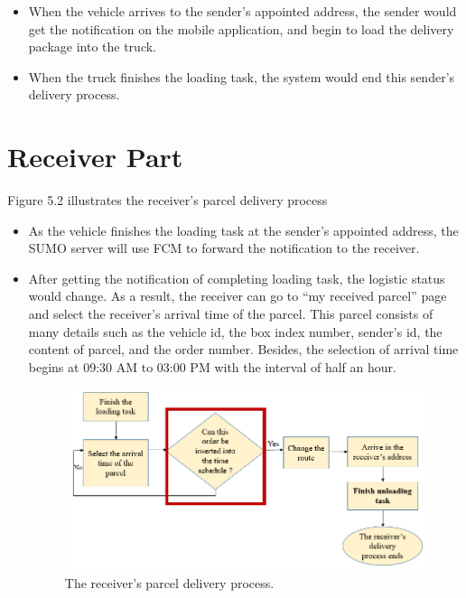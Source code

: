 \documentclass[12pt]{ksthesis}
\begin{document}
\begin{thesis}
{\begin{itemize}
\item
When the vehicle arrives to the sender’s appointed address, the sender would get the notification on the mobile application, and begin to load the delivery package into the truck.

\item
When the truck finishes the loading task, the system would end this sender’s delivery process.

\end{itemize}







\section{Receiver Part}


Figure 5.2 illustrates the receiver’s parcel delivery process

\begin{itemize}
\item
As the vehicle finishes the loading task at the sender’s appointed address, the SUMO server will use FCM to forward the notification to the receiver.

\item
After getting the notification of completing loading task, the logistic status would change. As a result, the receiver can go to “my received parcel” page and select the receiver’s arrival time of the parcel. This parcel consists of many details such as the vehicle id, the box index number, sender’s id, the content of parcel, and the order number. Besides, the selection of arrival time begins at 09:30 AM to 03:00 PM with the interval of half an hour.

\begin{figure}[H]
\centering
\includegraphics[width=1.0\textwidth]{./Thesis_figures/F5-2_receiver_delivery_process.PNG}
\caption{\large The receiver's parcel delivery process.}
\vspace{0.5cm}
\label{Fig:receiver_process}
\end{figure}


\end{itemize}}
\end{thesis}
\end{document}
